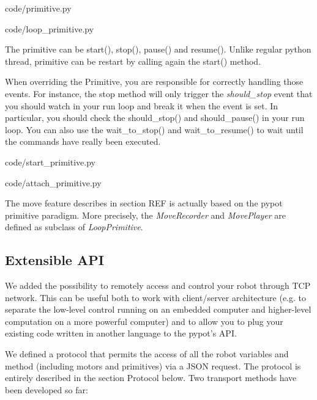 
    {code/primitive.py}


    {code/loop_primitive.py}

The primitive can be start(), stop(), pause() and resume(). Unlike regular python thread, primitive can be restart by calling again the start() method.

When overriding the Primitive, you are responsible for correctly handling those events. For instance, the stop method will only trigger the \emph{should\_stop} event that you should watch in your run loop and break it when the event is set. In particular, you should check the should\_stop() and should\_pause() in your run loop. You can also use the wait\_to\_stop() and wait\_to\_resume() to wait until the commands have really been executed.



    {code/start_primitive.py}


    {code/attach_primitive.py}

The move feature describes in section REF is actually based on the pypot primitive paradigm. More precisely, the \emph{MoveRecorder} and \emph{MovePlayer} are defined as subclass of \emph{LoopPrimitive}.

\subsection{Extensible API} %

We added the possibility to remotely access and control your robot through TCP network. This can be useful both to work with client/server architecture (e.g. to separate the low-level control running on an embedded computer and higher-level computation on a more powerful computer) and to allow you to plug your existing code written in another language to the pypot’s API.

We defined a protocol that permits the access of all the robot variables and method (including motors and primitives) via a JSON request. The protocol is entirely described in the section Protocol below. Two transport methods have been developed so far:


